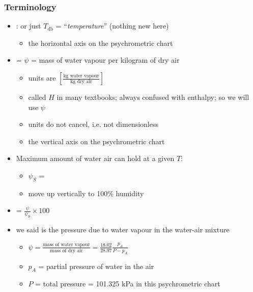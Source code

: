 \begin{frame}\frametitle{Terminology}
	\begin{itemize}
		\item	{\color{purple}{Dry bulb temperature}}: or just $T_\text{db}$ = ``\emph{temperature}'' {\tiny (nothing new here)}
		\begin{itemize}
			\item	the horizontal axis on the psychrometric chart
		\end{itemize}
		\item	{\color{purple}{Humidity}} = $\psi$ = mass of water vapour per kilogram of dry air
		\begin{itemize}
			\item	units are $ \left[ \displaystyle \frac{\text{kg water vapour}}{\text{kg dry air}}\right]$ 
			\item	called $H$ in many textbooks; always confused with enthalpy; so we will use $\psi$
			\item	units do not cancel, i.e. not dimensionless
			\item	the vertical axis on the psychrometric chart
		\end{itemize}
		\item	Maximum amount of water air can hold at a given $T$:
			\begin{itemize}
				\item	$\psi_S$ = {\color{purple}{saturation humidity}}
				\item	move up vertically to 100\% humidity
			\end{itemize}
		\item	{\color{purple}{Percentage humidity}} = $\displaystyle \frac{\psi}{\psi_S}\times 100$	
		\vspace{4pt}
		\item	{\color{purple}{Partial pressure}} we said is the pressure due to water vapour in the water-air mixture
		\vspace{4pt}
		\begin{itemize}
			\item	$\psi = \displaystyle \frac{\text{mass of water vapour}}{\text{mass of dry air}} = \displaystyle \frac{18.02}{28.97}\frac{p_A}{P-p_A}$
			\item	$p_A$ = partial pressure of water in the air
			\item	$P$ = total pressure = 101.325 kPa in this psychrometric chart
		\end{itemize}
	\end{itemize}
\end{frame}

